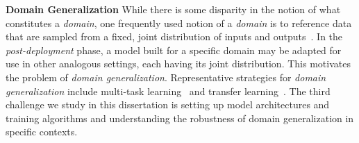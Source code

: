 \noindent \textbf{Domain Generalization}
While there is some disparity in the notion of what constitutes a \textit{domain}, one frequently used notion of a \textit{domain} is to reference data that are sampled from a fixed, joint distribution of inputs and outputs~\cite{wang2022generalizing}.
In the \textit{post-deployment} phase, a model built for a specific domain may be adapted for use in other analogous settings, each having its joint distribution.
This motivates the problem of \textit{domain generalization}. 
Representative strategies for \textit{domain generalization} include multi-task learning~\cite{caruana1997multitask} and transfer learning~\cite{zhuang2020comprehensive}.
The third challenge we study in this dissertation is setting up model architectures and training algorithms and understanding the robustness of domain generalization in specific contexts.



